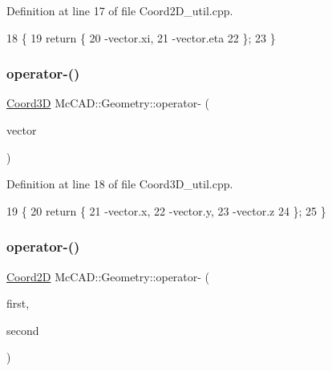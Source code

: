 Definition at line 17 of file Coord2\+D\+\_\+util.\+cpp.


\begin{DoxyCode}
18                               \{
19     \textcolor{keywordflow}{return} \{
20         -vector.xi,
21         -vector.eta
22     \};
23 \}
\end{DoxyCode}
\mbox{\label{namespaceMcCAD_1_1Geometry_a1ee9892658d4cce528a46c21663b058f}} 
\subsubsection{\texorpdfstring{operator-\/()}{operator-()}\hspace{0.1cm}{\footnotesize\ttfamily [3/6]}}
{\footnotesize\ttfamily \hyperlink{classMcCAD_1_1Geometry_1_1Coord3D}{Coord3D} Mc\+C\+A\+D\+::\+Geometry\+::operator-\/ (\begin{DoxyParamCaption}\item[{const \hyperlink{classMcCAD_1_1Geometry_1_1Coord3D}{Coord3D} \&}]{vector }\end{DoxyParamCaption})}



Definition at line 18 of file Coord3\+D\+\_\+util.\+cpp.


\begin{DoxyCode}
19                               \{
20     \textcolor{keywordflow}{return} \{
21         -vector.x,
22         -vector.y,
23         -vector.z
24     \};
25 \}
\end{DoxyCode}
\mbox{\label{namespaceMcCAD_1_1Geometry_a9f5f8f35d8efc74fdc86e06920f09194}} 
\subsubsection{\texorpdfstring{operator-\/()}{operator-()}\hspace{0.1cm}{\footnotesize\ttfamily [4/6]}}
{\footnotesize\ttfamily \hyperlink{classMcCAD_1_1Geometry_1_1Coord2D}{Coord2D} Mc\+C\+A\+D\+::\+Geometry\+::operator-\/ (\begin{DoxyParamCaption}\item[{const \hyperlink{classMcCAD_1_1Geometry_1_1Coord2D}{Coord2D} \&}]{first,  }\item[{const \hyperlink{classMcCAD_1_1Geometry_1_1Coord2D}{Coord2D} \&}]{second }\end{DoxyParamCaption})}



